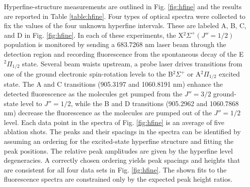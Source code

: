 \documentclass[amsmath,amssymb,aps,twocolumn,longbibliography,notitlepage]{revtex4-1}
\begin{document}
\endgroup
Hyperfine-structure measurements are outlined in Fig. \ref{fig:hfine} and the results are reported in Table \ref{table:hfine}.  Four types of optical spectra were collected to fix the values of the four unknown hyperfine intervals.  These are labeled A, B, C, and D in Fig. \ref{fig:hfine}.  In each of these experiments, the X$^2\Sigma^+ (J''=1/2)$ population is monitored by sending a 683.7268 nm laser beam through the detection region and recording fluorescence from the spontaneous decay of the E$^2\Pi_{1/2}$ state.  Several beam waists upstream, a probe laser drives transitions from one of the ground electronic spin-rotation levels to the B$^2\Sigma^+$ or A$^2\Pi_{1/2}$ excited state.  The A and C transitions (905.3197 and 1060.8191 nm) enhance the detected fluorescence as the molecules get pumped from the $J''=3/2$ ground-state level to $J''=1/2$, while the B and D transitions (905.2962 and 1060.7868 nm) decrease the fluorescence as the molecules are pumped out of the $J''=1/2$ level.  Each data point in the spectra of Fig. \ref{fig:hfine} is an average of five ablation shots.
The peaks and their spacings in the spectra can be identified by assuming an ordering for the excited-state hyperfine structure and fitting the peak positions. The relative peak amplitudes are given by the hyperfine level degeneracies.  A correctly chosen ordering yields peak spacings and heights that are consistent for all four data sets in Fig. \ref{fig:hfine}.  The shown fits to the fluorescence spectra are constrained only by the expected peak height ratios.
\end{document}
